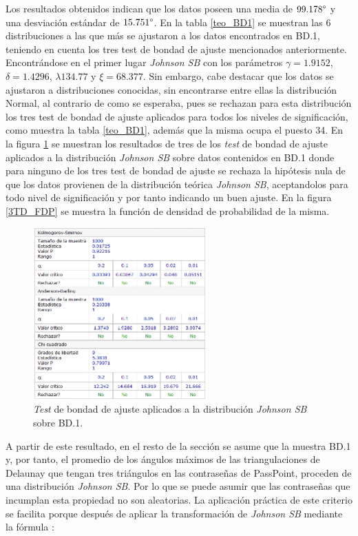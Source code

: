 \documentclass[12pt]{report}
\begin{document}
	 Los resultados obtenidos indican que los datos poseen una media de $99.178\degree$ y una desviación estándar de $15.751\degree$.
	 En la tabla \ref{teo_BD1}  se muestran las 6 distribuciones a las que más se ajustaron a los datos encontrados en BD.1, teniendo en cuenta los tres test de bondad de ajuste mencionados anteriormente. Encontrándose en el primer lugar \textit{Johnson SB} con los parámetros $\gamma=1.9152$, $\delta=1.4296$, $\lambda134.77$ y $\xi=68.377$.  Sin embargo, cabe destacar que los datos se ajustaron a  distribuciones conocidas, sin encontrarse entre ellas la distribución Normal, al contrario de como se esperaba, pues se rechazan para esta distribución los tres test de bondad de ajuste aplicados para todos los niveles de significación, como muestra la tabla \ref{teo_BD1}, además que la misma ocupa el puesto 34. En la figura \ref{3TD_BONDAD} se  muestran los resultados de tres de los \textit{test} de bondad de ajuste aplicados a la distribución \textit{Johnson SB} sobre  datos contenidos en BD.1 donde  para ninguno de los tres test de bondad de ajuste  se rechaza la hipótesis nula de que los datos provienen de la distribución teórica \textit{Johnson SB}, aceptandolos para todo nivel de significación  y por tanto indicando un buen ajuste. En la figura \ref{3TD_FDP}  se muestra la función de densidad de probabilidad de la misma.
	  	\begin{figure}[ht]
	  	\centering
	  	
 	  	\includegraphics[width=0.6\textwidth]{3td_BONDAD.png}
	  	\caption{\textit{Test} de bondad de ajuste aplicados a la distribución \textit{Johnson SB} sobre BD.1.}
	  	\label{3TD_BONDAD}
	  \end{figure}
	  
	  
	 
	 A partir de este resultado, en el resto de la sección se asume que la muestra BD.1 y, por tanto, el promedio de los ángulos máximos de las triangulaciones de Delaunay que tengan tres triángulos en las contraseñas de PassPoint, proceden de una distribución \textit{Johnson SB}. Por lo que se puede asumir que las contraseñas que incumplan esta propiedad no son aleatorias.
	 La aplicación práctica de este criterio se facilita porque después de  aplicar la transformación de \textit{Johnson SB}  mediante la fórmula \cite{30} :
	 
\end{document}
